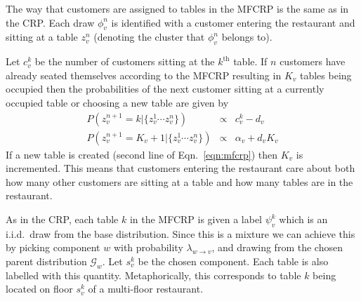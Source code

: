 \documentclass{article}
\newcommand{\comment}[1]{}
\begin{document}
\comment{an abstraction which captures the distinct clustering property of draws $x_i \sim \mathcal{G}$ where $\mathcal{G} \sim \text{PY}(\alpha, d, \mathcal{G}_0)$ and $\mathcal{G}_0$ is a mixture (perhaps with a single component).  \comment{Additionally, the posterior predictive distribution of $x_{n+1} | x_{1:n}, \alpha, d$ from such a model with $\mathcal{G}$ marginalized out can be expressed in terms of this process.  }This name derives from the Chinese restaurant process which serves the same purpose but does not accommodate  mixture base distributions.  We assume reader familiarity with how the assignment of customers to tables in the Chinese restaurant process exhibits the same clustering properties as draws from a posterior Pitman-Yor process and refer readers who are not to \citep{YW?}.}

The way that customers are assigned to tables in the MFCRP is the same as in the CRP.  Each draw $\phi_v^n$ is identified with a customer entering the restaurant and sitting at a table $z_v^n$ (denoting the cluster that $\phi_v^n$ belongs to).  
%
\comment{
Let $\bz_v = \{z_v^n\}_{n=1}^{N_v}\in\mathbb{Z}^+$ be a set of indicator variables that indicate at which table in the multi-floor restaurant each observation \comment{observation $\{x_v^n\}_{n=1}^{N_v}$ }sits and let $\bs_v = \{s_v^k\}_{k=1}^{K}$ be a set of ``floor'' indicator variables which indicate on which floor each table in the restaurant sits.
}
%
Let $c_v^k$ be the number of customers sitting at the $k^\mathrm{th}$ table.  If $n$ customers have already seated themselves according to the MFCRP resulting in $K_v$ tables being occupied then the probabilities of the next customer sitting at a currently occupied table or choosing a new table are given by
%
\begin{eqnarray}
P(z_v^{n+1} = k  | \{z_v^1\cdots z_v^n\}) &\propto& c_v^k-d_v \nonumber \\
P(z_v^{n+1} = K_v+1 | \{z_v^1\cdots z_v^n\})  &\propto& \alpha_v+d_vK_v  
\label{eqn:mfcrp}
\end{eqnarray}
%
If a new table is created (second line of Eqn.~\ref{eqn:mfcrp}) then $K_v$ is incremented.  This means that customers entering the restaurant care about both how many other customers are sitting at a table and how many tables are in the restaurant.  \comment{With higher probability, they will sit at larger tables, and they will sit at new tables if there are already many occupied tables.}

As in the CRP, each table $k$ in the MFCRP is given a label $\psi_v^k$ which is an i.i.d.~draw from the base distribution.  Since this is a mixture we can achieve this by picking component $w$ with probability $\lambda_{w\rightarrow v}$, and drawing from the chosen parent distribution $\mathcal{G}_w$.  Let $s_v^k$ be the chosen component.  Each table is also labelled with this quantity.  Metaphorically, this corresponds to table $k$ being located on floor $s_v^k$ of a multi-floor restaurant.
\end{document}
